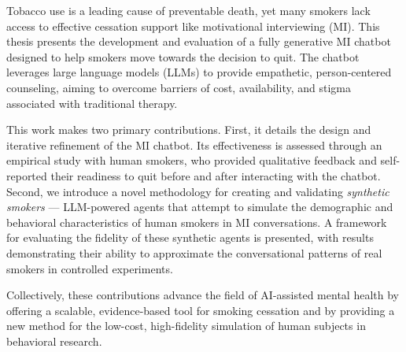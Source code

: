 Tobacco use is a leading cause of preventable death, yet many smokers lack access to effective cessation support like motivational interviewing (MI). This thesis presents the development and evaluation of a fully generative MI chatbot designed to help smokers move towards the decision to quit. The chatbot leverages large language models (LLMs) to provide empathetic, person-centered counseling, aiming to overcome barriers of cost, availability, and stigma associated with traditional therapy.

This work makes two primary contributions. First, it details the design and iterative refinement of the MI chatbot. Its effectiveness is assessed through an empirical study with human smokers, who provided qualitative feedback and self-reported their readiness to quit before and after interacting with the chatbot. Second, we introduce a novel methodology for creating and validating \emph{synthetic smokers} — LLM-powered agents that attempt to simulate the demographic and behavioral characteristics of human smokers in MI conversations. A framework for evaluating the fidelity of these synthetic agents is presented, with results demonstrating their ability to approximate the conversational patterns of real smokers in controlled experiments.

Collectively, these contributions advance the field of AI-assisted mental health by offering a scalable, evidence-based tool for smoking cessation and by providing a new method for the low-cost, high-fidelity simulation of human subjects in behavioral research.